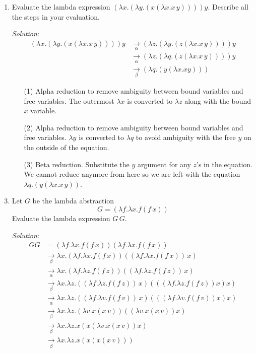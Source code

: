 \documentclass[]{article}
\begin{document}
\begin{enumerate}
\item Evaluate the lambda expression $(\lambda x.(\lambda y.(x(\lambda
x.x\,y))))y$. Describe all the steps in your evaluation.
\item[\emph{Solution}:]
\begin{align}
(\lambda x.(\lambda y.(x(\lambda x.x\,y))))y &\underset{\alpha}{\rightarrow}
(\lambda z.(\lambda y.(z(\lambda x.x\,y))))y \\
&\underset{\alpha}{\rightarrow}(\lambda z.(\lambda q.(z(\lambda x.x\,y))))y \\
&\underset{\beta}{\rightarrow}(\lambda q.(y(\lambda x.x y)))
\end{align}
\begin{enumerate}
\item[(1)] Alpha reduction to remove ambiguity between bound variables and free
variables. The outermost $\lambda x$ is converted to $\lambda z$ along with the
bound $x$ variable.
\item[(2)] Alpha reduction to remove ambiguity between bound variables and free
variables. $\lambda y$ is converted to $\lambda q$ to avoid ambiguity with the
free $y$ on the outside of the equation.
\item[(3)] Beta reduction. Substitute the $y$ argument for any $z$'s in the
equation. We cannot reduce anymore from here so we are left with the equation
$\lambda q.(y(\lambda x.x\,y))$.
\end{enumerate}
\item Let $G$ be the lambda abstraction
\[ G = (\lambda f.\lambda x.f(f\,x)) \]
Evaluate the lambda expression $G\,G$.
\item[\emph{Solution}:]
\begin{align*}
GG &= (\lambda f.\lambda x.f(f\,x))(\lambda f.\lambda x.f(f\,x)) \\
&\underset{\beta}{\rightarrow}\lambda x.(\lambda f.\lambda x.f(f\,x))((\lambda
f.\lambda x.f(f\,x))\,x) \\
&\underset{\alpha}{\rightarrow}\lambda x.(\lambda f.\lambda z.f(f\,z))((\lambda
f.\lambda z.f(f\,z))\,x) \\
&\underset{\beta}{\rightarrow}\lambda x.\lambda z.((\lambda f.\lambda
z.f(f\,z))\,x)(((\lambda f.\lambda z.f(f\,z))x)x) \\
&\underset{\alpha}{\rightarrow}\lambda x.\lambda z.((\lambda f.\lambda
v.f(f\,v))\,x)(((\lambda f.\lambda v.f(f\,v))x)x) \\
&\underset{\beta}{\rightarrow}\lambda x.\lambda z.(\lambda v.x(x\,v))((\lambda
v.x(x\,v))x) \\
&\underset{\beta}{\rightarrow}\lambda x.\lambda z.x(x(\lambda v.x(x\,v))x) \\
&\underset{\beta}{\rightarrow}\lambda x.\lambda z.x(x(x(x\,v)))
\end{align*}


\end{enumerate}
\end{document}
